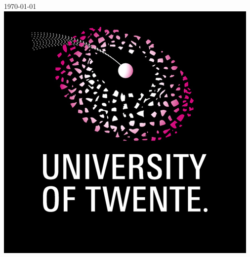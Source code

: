 \begin{titlepage}


{\large \today}\\[2cm] %


\includegraphics[scale=0.22]{Images/logo.png} %
 

\vfill %

\end{titlepage}